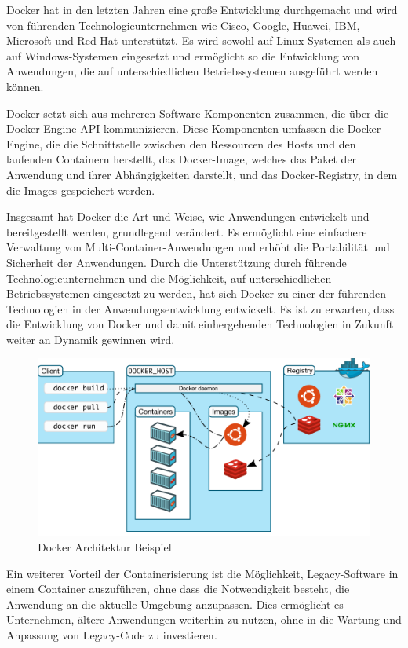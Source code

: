 Docker hat in den letzten Jahren eine große Entwicklung durchgemacht und wird von führenden Technologieunternehmen wie Cisco, Google, Huawei, IBM, Microsoft und Red Hat unterstützt. Es wird sowohl auf Linux-Systemen als auch auf Windows-Systemen eingesetzt und ermöglicht so die Entwicklung von Anwendungen, die auf unterschiedlichen Betriebssystemen ausgeführt werden können.

Docker setzt sich aus mehreren Software-Komponenten zusammen, die über die Docker-Engine-API kommunizieren. Diese Komponenten umfassen die Docker-Engine, die die Schnittstelle zwischen den Ressourcen des Hosts und den laufenden Containern herstellt, das Docker-Image, welches das Paket der Anwendung und ihrer Abhängigkeiten darstellt, und das Docker-Registry, in dem die Images gespeichert werden.

Insgesamt hat Docker die Art und Weise, wie Anwendungen entwickelt und bereitgestellt werden, grundlegend verändert. Es ermöglicht eine einfachere Verwaltung von Multi-Container-Anwendungen und erhöht die Portabilität und Sicherheit der Anwendungen. Durch die Unterstützung durch führende Technologieunternehmen und die Möglichkeit, auf unterschiedlichen Betriebssystemen eingesetzt zu werden, hat sich Docker zu einer der führenden Technologien in der Anwendungsentwicklung entwickelt. Es ist zu erwarten, dass die Entwicklung von Docker und damit einhergehenden Technologien in Zukunft weiter an Dynamik gewinnen wird. \cite{dockeroverview}

\begin{figure}[htbp]
	\includegraphics[scale=0.33]{gfx/Docker.png}
	\caption{Docker Architektur Beispiel}
\end{figure}


Ein weiterer Vorteil der Containerisierung ist die Möglichkeit, Legacy-Software in einem Container auszuführen, ohne dass die Notwendigkeit besteht, die Anwendung an die aktuelle Umgebung anzupassen.
Dies ermöglicht es Unternehmen, ältere Anwendungen weiterhin zu nutzen, ohne in die Wartung und Anpassung von Legacy-Code zu investieren.

